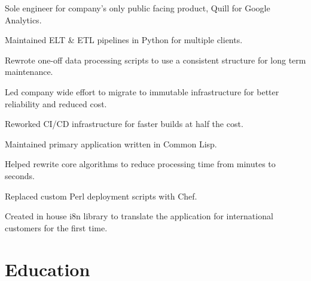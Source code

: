 \documentclass[]{deedy-resume-openfont}
\begin{document}
\sectionsep
{}
\vspace{\topsep}
\begin{tightemize}
\item Sole engineer for company's only public facing product, Quill for Google Analytics.
\item Maintained ELT \& ETL pipelines in Python for multiple clients.
\item Rewrote one-off data processing scripts to use a consistent structure for long term maintenance.
\item Led company wide effort to migrate to immutable infrastructure for better reliability and reduced cost.
\item Reworked CI/CD infrastructure for faster builds at half the cost.
\end{tightemize}

\sectionsep
{}
\vspace{\topsep}
\begin{tightemize}
\item Maintained primary application written in Common Lisp.
\item Helped rewrite core algorithms to reduce processing time from minutes to seconds.
\item Replaced custom Perl deployment scripts with Chef.
\item Created in house i8n library to translate the application for international customers for the first time.
\end{tightemize}

\section{Education}
\sectionsep

\sectionsep
\end{document}
